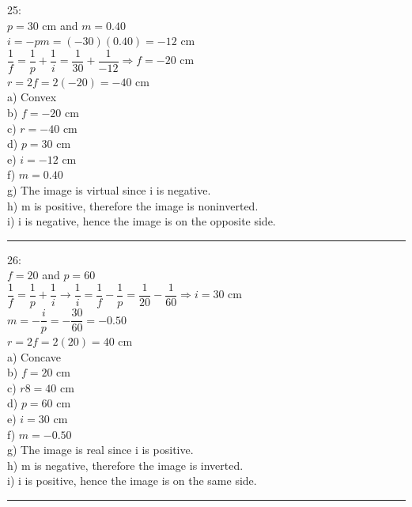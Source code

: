 \documentclass[fleqn]{article}
\begin{document}
\begin{enumerate}
    \textcolor{hwColor}{
      25: \\
      $p=30$ cm and $m=0.40$ \\
      $i=-pm=(-30)(0.40)=-12$ cm \\
      $\dfrac{1}{f}=\dfrac{1}{p}+\dfrac{1}{i}=\dfrac{1}{30}+\dfrac{1}{-12} \Longrightarrow f=-20$ cm \\
      $r=2f=2(-20)=-40$ cm \\
      a) Convex \\
      b) $f=-20$ cm \\
      c) $r=-40$ cm \\
      d) $p=30$ cm \\
      e) $i=-12$ cm \\
      f) $m=0.40$ \\
      g) The image is virtual since i is negative. \\
      h) m is positive, therefore the image is noninverted. \\
      i) i is negative, hence the image is on the opposite side. \\
    }


    \textcolor{hwColor}{
      \rule{15cm}{0.4pt}
    }

    \textcolor{hwColor}{
      26: \\
      $f=20$ and $p=60$ \\
      $\dfrac{1}{f}=\dfrac{1}{p}+\dfrac{1}{i} \rightarrow \dfrac{1}{i}=\dfrac{1}{f}-\dfrac{1}{p}=\dfrac{1}{20}-\dfrac{1}{60} \Longrightarrow i=30$ cm \\
      $m=-\dfrac{i}{p}=-\dfrac{30}{60}=-0.50$ \\
      $r=2f=2(20)=40$ cm \\
      a) Concave \\
      b) $f=20$ cm \\
      c) $r8=40$ cm \\
      d) $p=60$ cm \\
      e) $i=30$ cm \\
      f) $m=-0.50$ \\
      g) The image is real since i is positive. \\
      h) m is negative, therefore the image is inverted. \\
      i) i is positive, hence the image is on the same side. \\
    }

    \textcolor{hwColor}{
      \rule{15cm}{0.4pt}
    }


\end{enumerate}
\end{document}

